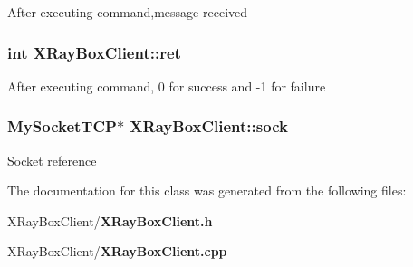 After executing command,message received 
\subsubsection{\setlength{\rightskip}{0pt plus 5cm}int \bf{XRay\-Box\-Client::ret}\hspace{0.3cm}{\tt  [private]}}\label{classXRayBoxClient_6e038f1974117101e8df83bf4fc0bb19}


After executing command, 0 for success and -1 for failure 
\subsubsection{\setlength{\rightskip}{0pt plus 5cm}\bf{My\-Socket\-TCP}$\ast$ \bf{XRay\-Box\-Client::sock}\hspace{0.3cm}{\tt  [private]}}\label{classXRayBoxClient_4dc81ea2ccf348b2839434bde0e6f97b}


Socket reference 

The documentation for this class was generated from the following files:\begin{CompactItemize}
\item 
XRay\-Box\-Client/\bf{XRay\-Box\-Client.h}\item 
XRay\-Box\-Client/\bf{XRay\-Box\-Client.cpp}\end{CompactItemize}
